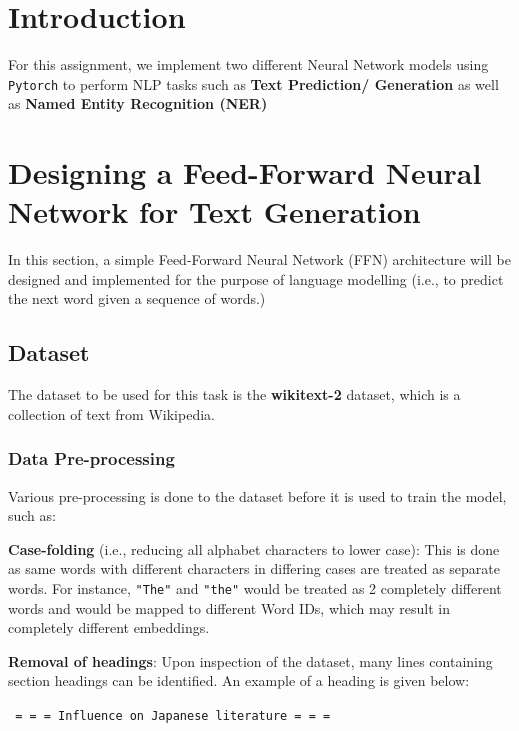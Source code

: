 \documentclass[sigconf,nonacm=true]{acmart}
\begin{document}
\maketitle

\section{Introduction}
For this assignment, we implement two different Neural Network models using \verb|Pytorch| to perform NLP tasks such as \textbf{Text Prediction/ Generation} as well as \textbf{Named Entity Recognition (NER)}

\section{Designing a Feed-Forward Neural Network for Text Generation}
In this section, a simple Feed-Forward Neural Network (FFN) architecture
will be designed and implemented for the purpose of language modelling
(i.e., to predict the next word given a sequence of words.)

\subsection{Dataset}
\label{subsection:dataset}
The dataset to be used for this task is the \textbf{wikitext-2} dataset,
which is a collection of text from Wikipedia.
\subsubsection{Data Pre-processing}
Various pre-processing is done to the dataset before it is used to train the 
model, such as:

\textbf{Case-folding} (i.e., reducing all alphabet characters to lower case): 
This is done as same words with different characters in differing cases are
treated as separate words. For instance, \verb|"The"| and \verb|"the"| would
be treated as 2 completely different words and would be mapped to different 
Word IDs, which may result in completely different embeddings.

\textbf{Removal of headings}: Upon inspection of the dataset, many lines containing
section headings can be identified. An example of a heading is given below:

\verb| = = = Influence on Japanese literature = = = |
\end{document}
